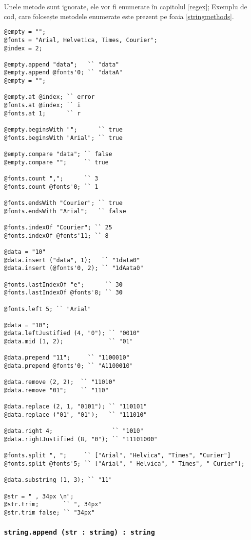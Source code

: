 Unele metode sunt ignorate, ele vor fi enumerate în capitolul \ref{regex}; Exemplu de cod, care folosește metodele enumerate este prezent pe foaia \ref{stringmethods}.

\begin{lstlisting}[caption=Metodele clasei string, label=stringmethods]
@empty = "";
@fonts = "Arial, Helvetica, Times, Courier";
@index = 2;

@empty.append "data";   `` "data"
@empty.append @fonts'0; `` "dataA"
@empty = "";

@empty.at @index; `` error
@fonts.at @index; `` i
@fonts.at 1;	  `` r

@empty.beginsWith "";      `` true
@fonts.beginsWith "Arial"; `` true

@empty.compare "data"; `` false
@empty.compare "";     `` true

@fonts.count ",";      `` 3
@fonts.count @fonts'0; `` 1

@fonts.endsWith "Courier"; `` true
@fonts.endsWith "Arial";   `` false

@fonts.indexOf "Courier"; `` 25
@fonts.indexOf @fonts'11; `` 8

@data = "10"
@data.insert ("data", 1);   `` "1data0"
@data.insert (@fonts'0, 2); `` "1dAata0"

@fonts.lastIndexOf "e";      `` 30
@fonts.lastIndexOf @fonts'8; `` 30

@fonts.left 5; `` "Arial"

@data = "10";
@data.leftJustified (4, "0"); `` "0010"
@data.mid (1, 2);             `` "01"

@data.prepend "11";     `` "1100010"
@data.prepend @fonts'0; `` "A1100010"

@data.remove (2, 2);  `` "11010"
@data.remove "01";    `` "110"

@data.replace (2, 1, "0101"); `` "110101"
@data.replace ("01", "01");   `` "111010"

@data.right 4; 				   `` "1010"
@data.rightJustified (8, "0"); `` "11101000"

@fonts.split ", ";     `` ["Arial", "Helvica", "Times", "Curier"]
@fonts.split @fonts'5; `` ["Arial", " Helvica", " Times", " Curier"];

@data.substring (1, 3); `` "11"

@str = " , 34px \n";
@str.trim;       `` ", 34px"
@str.trim false; `` "34px"
\end{lstlisting}

\subsubsection{\lstinline|string.append (str : string) : string|}

